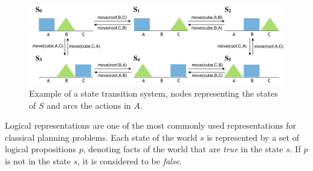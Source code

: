 

\begin{figure}[ht]
	\centering
	\includegraphics[width=\linewidth]{figures/state-transition-system}
	\caption{Example of a state transition system, nodes representing the states of $S$ and arcs the actions in $A$.}
	\label{fig:state-transition-system}
\end{figure}

Logical representations are one of the most commonly used representations for classical planning problems. 
Each state of the world $s$ is represented by a set of logical propositions $p$, denoting facts of the world that are \textit{true} in the state $s$. 
If $p$ is not in the state $s$, it is considered to be \textit{false}.



